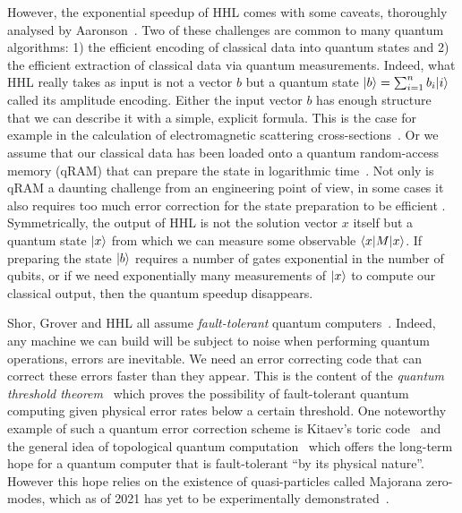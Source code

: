 However, the exponential speedup of HHL comes with some caveats,
thoroughly analysed by Aaronson~\cite{Aaronson15}.
Two of these challenges are common to many quantum algorithms:
1) the efficient encoding of classical data into quantum states and
2) the efficient extraction of classical data via quantum measurements.
Indeed, what HHL really takes as input is not a vector ${b}$ but
a quantum state $|b\rangle = \sum_{i=1}^n b_i |i\rangle$ called its amplitude encoding.
Either the input vector ${b}$ has enough structure that we can describe
it with a simple, explicit formula.
This is the case for example in the calculation of electromagnetic scattering
cross-sections~\cite{CladerEtAl13}.
Or we assume that our classical data has been loaded onto a
quantum random-access memory (qRAM) that can prepare the state in logarithmic time~\cite{GiovannettiEtAl08}.
Not only is qRAM a daunting challenge from an engineering point of view,
in some cases it also requires too much error correction
for the state preparation to be efficient \cite{ArunachalamEtAl15}.
Symmetrically, the output of HHL is not the solution vector ${x}$
itself but a quantum state $|x\rangle$ from which we can measure some observable
$\langle x| M |x\rangle$. If preparing the state $|b\rangle$ requires a number of gates
exponential in the number of qubits, or if we need exponentially many
measurements of $|x\rangle$ to compute our classical output, then
the quantum speedup disappears.

Shor, Grover and HHL all assume \emph{fault-tolerant}
quantum computers~\cite{Shor96}.
Indeed, any machine we can build will be subject to noise when performing
quantum operations, errors are inevitable.
We need an error correcting code
that can correct these errors faster than they appear.
This is the content of the \emph{quantum threshold theorem}~\cite{AharonovBen-Or08}
which proves the possibility of fault-tolerant quantum computing
given physical error rates below a certain threshold.
One noteworthy example of such a quantum error correction scheme is Kitaev's
toric code~\cite{Kitaev03} and the general idea of topological quantum
computation~\cite{FreedmanEtAl03} which offers the long-term hope for a
quantum computer that is fault-tolerant ``by its physical nature''.
However this hope relies on the existence of quasi-particles called Majorana
zero-modes, which as of 2021 has yet to be experimentally demonstrated~\cite{Ball21}.

